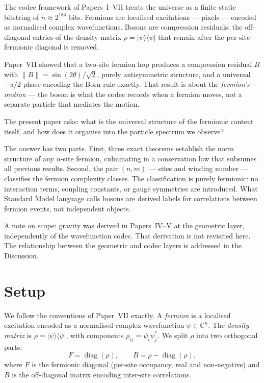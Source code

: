 \documentclass[11pt]{article}
\begin{document}
The codec framework of Papers~I--VII treats the universe as a finite
static bitstring of $n \approx 2^184$ bits.
Fermions are localised excitations --- pixels --- encoded as
normalised complex wavefunctions.
Bosons are compression residuals: the off-diagonal entries of the
density matrix $\rho = |\psi\rangle\langle\psi|$ that remain after
the per-site fermionic diagonal is removed.

Paper~VII showed that a two-site fermion hop produces a compression
residual $B$ with $\|B\| = \sin(2\theta)/\sqrt{2}$, purely
antisymmetric structure, and a universal $-\pi/2$ phase encoding the
Born rule exactly.
That result is about the \emph{fermion's motion} --- the boson is
what the codec records when a fermion moves, not a separate particle
that mediates the motion.

The present paper asks: what is the universal structure of the
fermionic content itself, and how does it organise into the particle
spectrum we observe?

The answer has two parts.
First, three exact theorems establish the norm structure of any
$n$-site fermion, culminating in a conservation law that subsumes
all previous results.
Second, the pair $(n, m)$ --- sites and winding number --- classifies
the fermion complexity classes.
The classification is purely fermionic: no interaction terms,
coupling constants, or gauge symmetries are introduced.
What Standard Model language calls bosons are derived labels for
correlations between fermion events, not independent objects.

A note on scope: gravity was derived in Papers~IV--V at the geometric
layer, independently of the wavefunction codec.
That derivation is not revisited here.
The relationship between the geometric and codec layers is addressed
in the Discussion.

\section{Setup}
\label{sec:setup}

We follow the conventions of Paper~VII exactly.
A \emph{fermion} is a localised excitation encoded as a normalised
complex wavefunction $\psi \in \mathbb{C}^n$.
The \emph{density matrix} is $\rho = |\psi\rangle\langle\psi|$,
with components $\rho_{ij} = \psi_i\psi_j^*$.
We split $\rho$ into two orthogonal parts:
\[
  F = \operatorname{diag}(\rho), \qquad
  B = \rho - \operatorname{diag}(\rho),
\]
where $F$ is the fermionic diagonal (per-site occupancy, real and
non-negative) and $B$ is the off-diagonal matrix encoding
inter-site correlations.
\end{document}
